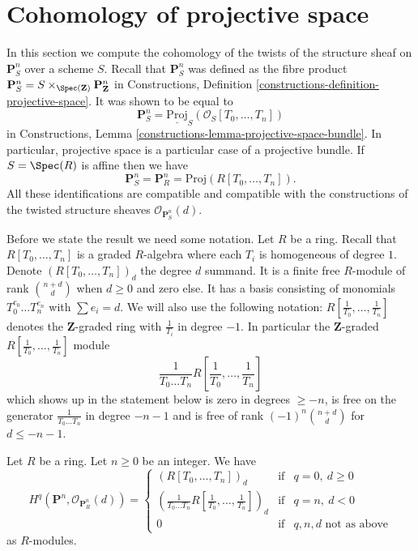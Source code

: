 \section{Cohomology of projective space}
\label{section-cohomology-projective-space}

\noindent
In this section we compute the cohomology of the twists of the
structure sheaf on $\mathbf{P}^n_S$ over a scheme $S$.
Recall that $\mathbf{P}^n_S$ was defined as the fibre product
$
\mathbf{P}^n_S = S \times_{\Spec(\mathbf{Z})} \mathbf{P}^n_{\mathbf{Z}}
$
in Constructions, Definition \ref{constructions-definition-projective-space}.
It was shown to be equal to
$$
\mathbf{P}^n_S = \underline{\text{Proj}}_S(\mathcal{O}_S[T_0, \ldots, T_n])
$$
in Constructions, Lemma \ref{constructions-lemma-projective-space-bundle}.
In particular, projective space is a particular case of a projective bundle.
If $S = \Spec(R)$ is affine then we have
$$
\mathbf{P}^n_S = \mathbf{P}^n_R = \text{Proj}(R[T_0, \ldots, T_n]).
$$
All these identifications are compatible and compatible with the constructions
of the twisted structure sheaves $\mathcal{O}_{\mathbf{P}^n_S}(d)$.

\medskip\noindent
Before we state the result we need some notation.
Let $R$ be a ring.
Recall that $R[T_0, \ldots, T_n]$ is a graded
$R$-algebra where each $T_i$ is homogeneous of degree $1$.
Denote $(R[T_0, \ldots, T_n])_d$ the degree $d$ summand.
It is a finite free $R$-module of rank $\binom{n + d}{d}$
when $d \geq 0$ and zero else.
It has a basis consisting of monomials $T_0^{e_0} \ldots T_n^{e_n}$
with $\sum e_i = d$. We will also use the following notation:
$R[\frac{1}{T_0}, \ldots, \frac{1}{T_n}]$ denotes the $\mathbf{Z}$-graded
ring with $\frac{1}{T_i}$ in degree $-1$. In particular the
$\mathbf{Z}$-graded $R[\frac{1}{T_0}, \ldots, \frac{1}{T_n}]$ module
$$
\frac{1}{T_0 \ldots T_n} R[\frac{1}{T_0}, \ldots, \frac{1}{T_n}]
$$
which shows up in the statement below is zero in degrees
$\geq -n$, is free on the generator $\frac{1}{T_0 \ldots T_n}$
in degree $-n - 1$ and is free of rank $(-1)^n\binom{n + d}{d}$ for
$d \leq -n - 1$.

\begin{lemma}
\label{lemma-cohomology-projective-space-over-ring}
\begin{reference}
\cite[III Proposition 2.1.12]{EGA}
\end{reference}
Let $R$ be a ring.
Let $n \geq 0$ be an integer.
We have
$$
H^q(\mathbf{P}^n, \mathcal{O}_{\mathbf{P}^n_R}(d)) =
\left\{
\begin{matrix}
(R[T_0, \ldots, T_n])_d & \text{if} & q = 0,\ d \geq 0 \\
\left(\frac{1}{T_0 \ldots T_n} R[\frac{1}{T_0}, \ldots, \frac{1}{T_n}]\right)_d
& \text{if} & q = n,\ d < 0 \\
0 & \text{if} & q, n, d\text{ not as above}
\end{matrix}
\right.
$$
as $R$-modules.
\end{lemma}

